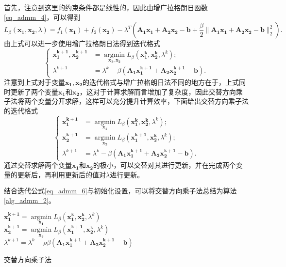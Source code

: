 首先，注意到这里的约束条件都是线性的，因此由增广拉格朗日函数\ref{eq_admm_4}，可以得到
\begin{equation*}
    L_{\beta}(\bm{x_{1}, x_{2}}, \lambda) = f_{1}(\bm{x_{1}}) + f_{2}(\bm{x_{2}}) - \lambda^{T}(\bm{A_{1}x_{1} + A_{2}x_{2}-b} + \frac{\beta}{2}\|\bm{A_{1}x_{1} + A_{2}x_{2}-b}\|_{2}^{2}).
\end{equation*}
由上式可以进一步使用增广拉格朗日法得到迭代格式
\begin{equation*}
    \begin{cases}
        \bm{x_{1}^{k+1}, x_{2}^{k+1}} &= \mathop{\mathrm{argmin}}\limits_{\bm{x_{1}, x_{2}}} L_{\beta}(\bm{x_{1}^{k}, x_{2}^{k}}, \lambda^{k}); \\
        \lambda^{k+1} &= \lambda^{k} - \beta (\bm{A_{1}x_{1}^{k+1} + A_{2}x_{2}^{k+1} - b}).
    \end{cases}
\end{equation*}
注意到上式对于变量$\bm{x_{1}, x_{2}}$的迭代格式与增广拉格朗日法不同的地方在于，上式同时更新了两个变量$\bm{x_{1}}$和$\bm{x_{2}}$，这对于计算求解而言增加了复杂度，因此交替方向乘子法将两个变量分开求解，这样可以充分提升计算效率，下面给出交替方向乘子法的迭代格式
\begin{equation}
    \begin{cases}
        \bm{x_{1}^{k+1}} &= \mathop{\mathrm{argmin}}\limits_{\bm{x_{1}}} L_{\beta}(\bm{x_{1}^{k}, x_{2}^{k}}, \lambda^{k}) ; \\
        \bm{x_{2}^{k+1}} &= \mathop{\mathrm{argmin}}\limits_{\bm{x_{2}}} L_{\beta}(\bm{x_{1}^{k+1}, x_{2}^{k}}, \lambda^{k}) ; \\
        \lambda^{k+1} &= \lambda^{k} - \beta (\bm{A_{1}x_{1}^{k+1} + A_{2}x_{2}^{k+1} - b}).
    \end{cases}
    \label{eq_admm_6}
\end{equation}
通过交替求解两个变量$\bm{x_{1}}$和$\bm{x_{2}}$的极小，可以交替对其进行更新，并在完成两个变量的更新后，再利用更新后的值对$\lambda$进行更新。

结合迭代公式\ref{eq_admm_6}与初始化设置，可以将交替方向乘子法\cite{2017ADMM}总结为算法\ref{alg_admm_2}。
\begin{algorithm}

    \SetAlgoLined

     {
        $\bm{x_{1}^{k+1}} = \mathop{\mathrm{argmin}}\limits_{\bm{x_{1}}} L_{\beta}(\bm{x_{1}^{k}, x_{2}^{k}}, \lambda^{k})$  \\        
        
        $\bm{x_{2}^{k+1}} = \mathop{\mathrm{argmin}}\limits_{\bm{x_{2}}} L_{\beta}(\bm{x_{1}^{k+1}, x_{2}^{k}}, \lambda^{k})$  \\

        $\lambda^{k+1} = \lambda^{k} - \rho \beta (\bm{A_{1}x_{1}^{k+1} + A_{2}x_{2}^{k+1} - b})$
    }
    \caption{交替方向乘子法}
    \label{alg_admm_2}
\end{algorithm}

